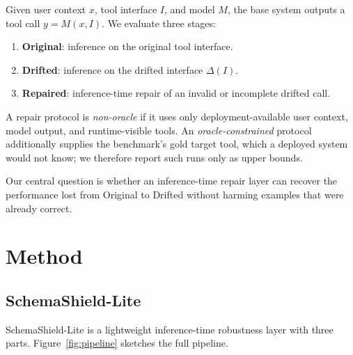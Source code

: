 \documentclass{llncs}
\newcommand{\method}{SchemaShield-Lite\xspace}
\begin{document}
Given user context $x$, tool interface $I$, and model $M$, the base system outputs a
tool call $y = M(x, I)$. We evaluate three stages:
\begin{enumerate}
\item \textbf{Original}: inference on the original tool interface.
\item \textbf{Drifted}: inference on the drifted interface $\Delta(I)$.
\item \textbf{Repaired}: inference-time repair of an invalid or incomplete drifted call.
\end{enumerate}

A repair protocol is \emph{non-oracle} if it uses only deployment-available user
context, model output, and runtime-visible tools. An \emph{oracle-constrained}
protocol additionally supplies the benchmark's gold target tool, which a deployed
system would not know; we therefore report such runs only as upper bounds.

Our central question is whether an inference-time repair layer can recover the
performance lost from Original to Drifted without harming examples that were already
correct.

\section{Method}
\label{sec:method}
\subsection{\method}
\method is a lightweight inference-time robustness layer with three parts.
Figure~\ref{fig:pipeline} sketches the full pipeline.
\end{document}
